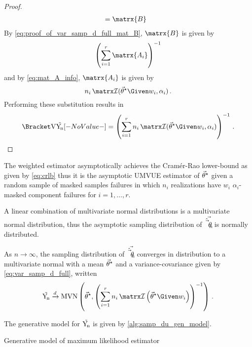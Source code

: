 \documentclass[ ../main.tex]{subfiles}
\begin{document}
\begin{proof}
\begin{align}
        &= \matrx{B}
\end{align}
By \cref{eq:proof_of_var_samp_d_full_mat_B}, $\matrx{B}$ is given by
\begin{equation}
    \left( \sum_{i=1}^{r} \matrx{A_i} \right)^{-1}
\end{equation}
and by \cref{eq:mat_A_info}, $\matrx{A_i}$ is given by
\begin{equation}
    n_i \infomatrx(\tparam\sysparamvec \Given w_i, \alpha_i)\,.
\end{equation}
Performing these substitution results in
\begin{equation}
    \Var{\sampdu} = \left( \sum_{i=1}^{r} n_i \infomatrx(\tparam\sysparamvec \Given w_i, \alpha_i) \right)^{-1}\,.
\end{equation}
\end{proof}

The weighted estimator asymptotically achieves the Cram\'{e}r-Rao lower-bound as given by \cref{eq:crlb} thus it is the asymptotic UMVUE estimator of ${\vec{\theta}}^{\star}$ given a random sample of masked samples failures in which $n_i$ realizations have $w_i$ $\alpha_i$-masked component failures for $i=1,\ldots,r$.

A linear combination of multivariate normal distributions is a multivariate normal distribution, thus the asymptotic sampling distribution of $\vec{\hat{\vec{\theta}}_{n}}$ is normally distributed.
\begin{postulate}
\label{def:converge_in_dist_full}
As $n \to \infty$, the sampling distribution of $\vec{\hat{\vec{\theta}}_{n}}$ converges in distribution to a multivariate normal with a mean ${\vec{\theta}}^{\star}$ and a variance-covariance given by \cref{eq:var_samp_d_full}, written
\begin{equation}
\label{eq:converge_in_dist_weighted}
    \sampdu \xrightarrow{d} \mvn\left(\tparam\sysparamvec, \left(\sum_{i=1}^{r} n_i \infomatrx\left(\tparam\sysparamvec \Given w_i \right)\right)^{-1}\right)\,.
\end{equation}
\end{postulate}

The generative model for $\mathrm{\vec{Y_{\!n}}}$ is given by \cref{alg:samp_du_gen_model}.
\begin{algorithm}
    \DontPrintSemicolon
    \BlankLine
\caption{Generative model of maximum likelihood estimator}
\label{alg:samp_du_gen_model}
\end{algorithm}
\end{document}
